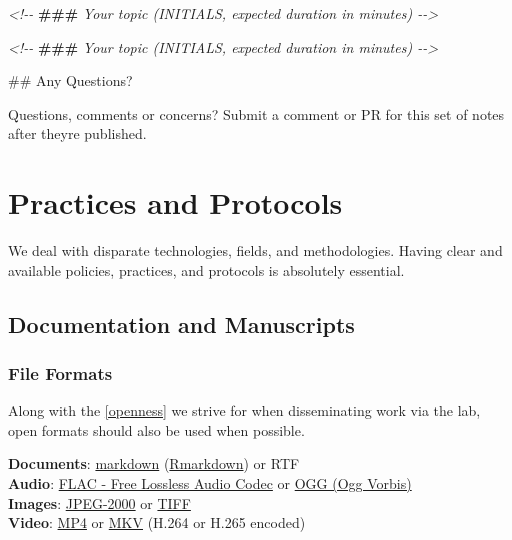 \documentclass[]{tufte-book}
\newenvironment{Shaded}{}{}
\newcommand{\AlertTok}[1]{\textcolor[rgb]{1.00,0.00,0.00}{\textbf{#1}}}
\newcommand{\CommentTok}[1]{\textcolor[rgb]{0.38,0.63,0.69}{\textit{#1}}}
\newcommand{\FunctionTok}[1]{\textcolor[rgb]{0.02,0.16,0.49}{#1}}
\newcommand{\NormalTok}[1]{#1}
\begin{document}
\begin{Shaded}
\begin{Highlighting}[]
\CommentTok{\textless{}!{-}{-} }\AlertTok{\#\#\#}\CommentTok{ Your topic (INITIALS, expected duration in minutes) {-}{-}\textgreater{}}

\CommentTok{\textless{}!{-}{-} }\AlertTok{\#\#\#}\CommentTok{ Your topic (INITIALS, expected duration in minutes) {-}{-}\textgreater{}}

\FunctionTok{\#\# Any Questions?}

\NormalTok{Questions, comments or concerns? Submit a comment or PR for this}
\NormalTok{set of notes after they\textquotesingle{}re published.}
\end{Highlighting}
\end{Shaded}

\hypertarget{protocols}{%
\chapter{Practices and Protocols}\label{protocols}}

We deal with disparate technologies, fields, and methodologies. Having clear and available policies, practices, and protocols is absolutely essential.

\hypertarget{docs-and-mans}{%
\section{Documentation and Manuscripts}\label{docs-and-mans}}

\hypertarget{fileformats}{%
\subsection{File Formats}\label{fileformats}}

Along with the \ref{openness} we strive for when disseminating work via the lab, open formats should also be used when possible.

\textbf{Documents}: \href{https://www.markdownguide.org/cheat-sheet}{markdown} (\href{https://uoepsy.github.io/usmr/cheatsheet/rmarkdown-2.0.pdf}{Rmarkdown}) or RTF\\
\textbf{Audio}: \href{https://xiph.org/flac/}{FLAC - Free Lossless Audio Codec} or \href{https://www.xiph.org/vorbis/}{OGG (Ogg Vorbis)}\\
\textbf{Images}: \href{https://jpeg.org/jpeg2000/index.html}{JPEG-2000} or \href{https://www.adobe.com/creativecloud/file-types/image/raster/tiff-file.html}{TIFF}\\
\textbf{Video}: \href{https://en.wikipedia.org/wiki/MPEG-4_Part_14}{MP4} or \href{https://en.wikipedia.org/wiki/Matroska}{MKV} (H.264 or H.265 encoded)
\end{document}
